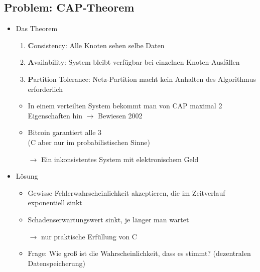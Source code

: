 \documentclass{article} %
\begin{document}
	\subsection{Problem: CAP-Theorem}
			\begin{itemize}
			\item Das Theorem
			\begin{enumerate}
				\item \textbf{C}onsistency: Alle Knoten sehen selbe Daten
				\item \textbf{A}vailability: System bleibt verfügbar bei einzelnen Knoten-Ausfällen
				\item \textbf{P}artition Tolerance: Netz-Partition macht kein Anhalten des Algorithmus erforderlich				
			\end{enumerate}
			\begin{itemize}
				\item In einem verteilten System bekommt man von CAP maximal 2 Eigenschaften hin $\rightarrow$ Bewiesen 2002
				\item Bitcoin garantiert alle 3 \\
				(C aber nur im probabilistischen Sinne)
				\item[$\rightarrow$] Ein inkonsistentes System mit elektronischem Geld
			\end{itemize}
			\item Lösung
			\begin{itemize}
				\item Gewisse Fehlerwahrscheinlichkeit akzeptieren, die im Zeitverlauf exponentiell sinkt
				\item Schadenserwartungswert sinkt, je länger man wartet
				\item[$\rightarrow$] nur praktische Erfüllung von C
				\item Frage: Wie groß ist die Wahrscheinlichkeit, dass es stimmt? (dezentralen Datenspeicherung)
			\end{itemize}
			\end{itemize}
			
\end{document}
